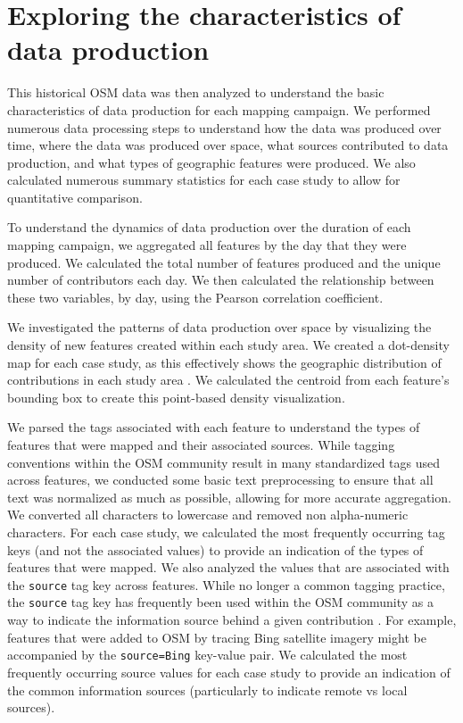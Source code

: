 \section{Exploring the characteristics of data production}
\label{sec-production}

This historical OSM data was then analyzed to understand the basic characteristics of data production for each mapping campaign. We performed numerous data processing steps to understand how the data was produced over time, where the data was produced over space, what sources contributed to data production, and what types of geographic features were produced. We also calculated numerous summary statistics for each case study to allow for quantitative comparison.

To understand the dynamics of data production over the duration of each mapping campaign, we aggregated all features by the day that they were produced. We calculated the total number of features produced and the unique number of contributors each day. We then calculated the relationship between these two variables, by day, using the Pearson correlation coefficient. 

We investigated the patterns of data production over space by visualizing the density of new features created within each study area. We created a dot-density map for each case study, as this effectively shows the geographic distribution of contributions in each study area \parencite{kimerling_dotting_2009}. We calculated the centroid from each feature's bounding box to create this point-based density visualization. 

We parsed the tags associated with each feature to understand the types of features that were mapped and their associated sources. While tagging conventions within the OSM community result in many standardized tags used across features, we conducted some basic text preprocessing to ensure that all text was normalized as much as possible, allowing for more accurate aggregation. We converted all characters to lowercase and removed non alpha-numeric characters. For each case study, we calculated the most frequently occurring tag keys (and not the associated values) to provide an indication of the types of features that were mapped. We also analyzed the values that are associated with the \texttt{source} tag key across features. While no longer a common tagging practice, the \texttt{source} tag key has frequently been used within the OSM community as a way to indicate the information source behind a given contribution \parencite{noauthor_keysource_2020}. For example, features that were added to OSM by tracing Bing satellite imagery might be accompanied by the \texttt{source=Bing} key-value pair. We calculated the most frequently occurring source values for each case study to provide an indication of the common information sources (particularly to indicate remote vs local sources). 

